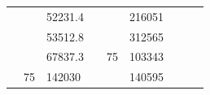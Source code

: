 \begin{table}[]
\begin{tabular}{|cclccllll}
\multicolumn{1}{|c|}{\cellcolor[HTML]{FFFFC7}}                                & \multicolumn{1}{c|}{\cellcolor[HTML]{DAE8FC}}                      & \multicolumn{1}{l|}{\cellcolor[HTML]{DAE8FC}52231.4}   & \multicolumn{1}{c|}{\cellcolor[HTML]{FFFFC7}}                                & \multicolumn{1}{c|}{\cellcolor[HTML]{DAE8FC}}                       & \multicolumn{1}{l|}{\cellcolor[HTML]{DDFDFF}216051}    &                                                                              &                                                                    &                                                        \\ \cline{3-3} \cline{6-6}
\multicolumn{1}{|c|}{\cellcolor[HTML]{FFFFC7}}                                & \multicolumn{1}{c|}{\cellcolor[HTML]{DAE8FC}}                      & \multicolumn{1}{l|}{\cellcolor[HTML]{DDFDFF}53512.8}   & \multicolumn{1}{c|}{\cellcolor[HTML]{FFFFC7}}                                & \multicolumn{1}{c|}{\cellcolor[HTML]{DAE8FC}}                       & \multicolumn{1}{l|}{\cellcolor[HTML]{DAE8FC}312565}    &                                                                              &                                                                    &                                                        \\ \cline{3-3} \cline{6-6}
\multicolumn{1}{|c|}{\cellcolor[HTML]{FFFFC7}}                                & \multicolumn{1}{c|}{\cellcolor[HTML]{DAE8FC}}                      & \multicolumn{1}{l|}{\cellcolor[HTML]{DAE8FC}67837.3}   & \multicolumn{1}{c|}{\cellcolor[HTML]{FFFFC7}}                                & \multicolumn{1}{c|}{\multirow{-10}{*}{\cellcolor[HTML]{DAE8FC}75}}  & \multicolumn{1}{l|}{\cellcolor[HTML]{DDFDFF}103343}    &                                                                              &                                                                    &                                                        \\ \cline{3-3} \cline{5-6}
\multicolumn{1}{|c|}{\cellcolor[HTML]{FFFFC7}}                                & \multicolumn{1}{c|}{\multirow{-10}{*}{\cellcolor[HTML]{DAE8FC}75}} & \multicolumn{1}{l|}{\cellcolor[HTML]{DDFDFF}142030}    & \multicolumn{1}{c|}{\cellcolor[HTML]{FFFFC7}}                                & \multicolumn{1}{c|}{\cellcolor[HTML]{DDFDFF}}                       & \multicolumn{1}{l|}{\cellcolor[HTML]{DAE8FC}140595}    &                                                                              &                                                                    &                                                        \\ \cline{2-3} \cline{6-6}

\end{tabular}
\end{table}
